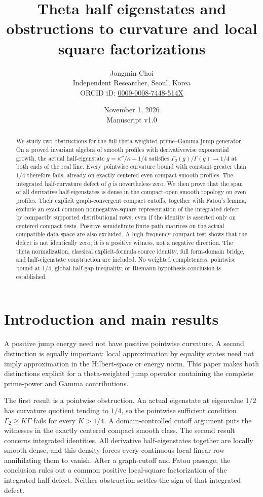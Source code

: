 \documentclass[11pt,a4paper]{article}
\title{Theta half eigenstates and obstructions to curvature and local square factorizations}
\author{Jongmin Choi\\[3pt]\small Independent Researcher, Seoul, Korea\\\small ORCID iD: \href{https://orcid.org/0009-0008-7448-514X}{0009-0008-7448-514X}}
\date{November 1, 2026\\[3pt]\small Manuscript v1.0}
\numberwithin{equation}{section}
\theoremstyle{definition}
\theoremstyle{remark}
\begin{document}
\maketitle
\begin{abstract}
We study two obstructions for the full theta-weighted prime--Gamma jump generator. On a proved invariant algebra of smooth profiles with derivativewise exponential growth, the actual half-eigenstate $g=\kappa''/\kappa-1/4$ satisfies $\Gamma_2(g)/\Gamma(g)\to1/4$ at both ends of the real line. Every pointwise curvature bound with constant greater than $1/4$ therefore fails, already on exactly centered even compact smooth profiles. The integrated half-curvature defect of $g$ is nevertheless zero. We then prove that the span of all derivative half-eigenstates is dense in the compact-open smooth topology on even profiles. Their explicit graph-convergent compact cutoffs, together with Fatou's lemma, exclude an exact common nonnegative-square representation of the integrated defect by compactly supported distributional rows, even if the identity is asserted only on centered compact tests. Positive semidefinite finite-path matrices on the actual compatible data space are also excluded. A high-frequency compact test shows that the defect is not identically zero; it is a positive witness, not a negative direction. The theta normalization, classical explicit-formula source identity, full form-domain bridge, and half-eigenstate construction are included. No weighted completeness, pointwise bound at $1/4$, global half-gap inequality, or Riemann-hypothesis conclusion is established.
\end{abstract}

\section{Introduction and main results}

A positive jump energy need not have positive pointwise curvature. A second distinction is equally important: local approximation by equality states need not imply approximation in the Hilbert-space or energy norm. This paper makes both distinctions explicit for a theta-weighted jump operator containing the complete prime-power and Gamma contributions.

The first result is a pointwise obstruction. An actual eigenstate at eigenvalue $1/2$ has curvature quotient tending to $1/4$, so the pointwise sufficient condition $\Gamma_2\ge K\Gamma$ fails for every $K>1/4$. A domain-controlled cutoff argument puts the witnesses in the exactly centered compact smooth class. The second result concerns integrated identities. All derivative half-eigenstates together are locally smooth-dense, and this density forces every continuous local linear row annihilating them to vanish. After a graph-cutoff and Fatou passage, the conclusion rules out a common positive local-square factorization of the integrated half defect. Neither obstruction settles the sign of that integrated defect.
\end{document}
